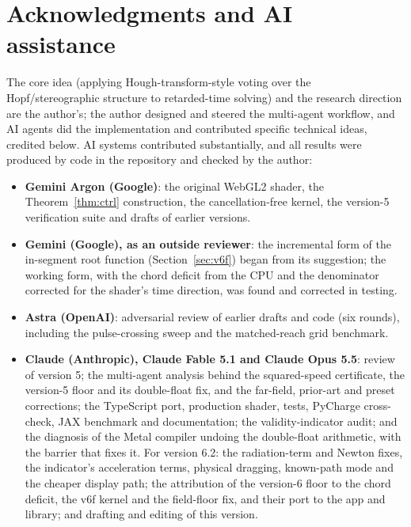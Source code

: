 \documentclass[11pt, a4paper]{article}
\begin{document}
\section*{Acknowledgments and AI assistance}
The core idea (applying Hough-transform-style voting over the Hopf/stereographic structure to retarded-time solving) and the research direction are the author's; the author designed and steered the multi-agent workflow, and AI agents did the implementation and contributed specific technical ideas, credited below. AI systems contributed substantially, and all results were produced by code in the repository and checked by the author:
\begin{itemize}
    \item \textbf{Gemini Argon (Google)}:
    the original WebGL2 shader, the Theorem~\ref{thm:ctrl} construction, the cancellation-free kernel, the version-5 verification suite and drafts of earlier versions.
    \item \textbf{Gemini (Google), as an outside reviewer}: the incremental form of the in-segment root function (Section~\ref{sec:v6f}) began from its suggestion; the working form, with the chord deficit from the CPU and the denominator corrected for the shader's time direction, was found and corrected in testing.
    \item \textbf{Astra (OpenAI)}:
    adversarial review of earlier drafts and code (six rounds), including the pulse-crossing sweep and the matched-reach grid benchmark.
    \item \textbf{Claude (Anthropic), Claude Fable 5.1 and Claude Opus 5.5}: review of version 5; the multi-agent analysis behind the squared-speed certificate, the version-5 floor and its double-float fix, and the far-field, prior-art and preset corrections; the TypeScript port, production shader, tests, PyCharge cross-check, JAX benchmark and documentation; the validity-indicator audit; and the diagnosis of the Metal compiler undoing the double-float arithmetic, with the barrier that fixes it. For version 6.2: the radiation-term and Newton fixes, the indicator's acceleration terms, physical dragging, known-path mode and the cheaper display path; the attribution of the version-6 floor to the chord deficit, the v6f kernel and the field-floor fix, and their port to the app and library; and drafting and editing of this version.
\end{itemize}
\end{document}
